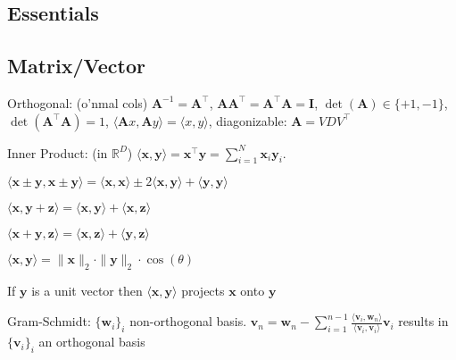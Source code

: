 \documentclass[a4paper, 11pt, landscape]{article}
\begin{document}
\begin{multicols*}{3}

\section{Essentials}
\subsection{Matrix/Vector}
\begin{compactdesc}
	\item[Orthogonal:] (o'nmal cols) $\mathbf{A}^{-1} = \mathbf{A}^\top$, $\mathbf{A} \mathbf{A}^\top = \mathbf{A}^\top \mathbf{A} = \mathbf{I}$, $\operatorname{det}(\mathbf{A}) \in \{+1, -1\}$, $\operatorname{det}(\mathbf{A}^\top \mathbf{A}) = 1$, $\langle \mathbf{A}x, \mathbf{A}y \rangle = \langle x, y \rangle$, diagonizable: $\mathbf{A} = VDV^\top$
	\item[Inner Product:] (in $\mathbb{R}^D$) $\langle \mathbf{x}, \mathbf{y} \rangle = \mathbf{x}^\top \mathbf{y} = \sum_{i=1}^{N} \mathbf{x}_i \mathbf{y}_i$.
	\begin{inparaitem}[\color{red}\textbullet]
		\item $\langle \mathbf{x} \pm \mathbf{y}, \mathbf{x} \pm \mathbf{y} \rangle = \langle \mathbf{x}, \mathbf{x} \rangle \pm 2 \langle \mathbf{x}, \mathbf{y} \rangle + \langle \mathbf{y}, \mathbf{y} \rangle$
		\item $\langle \mathbf{x}, \mathbf{y} + \mathbf{z} \rangle = \langle \mathbf{x}, \mathbf{y} \rangle + \langle \mathbf{x}, \mathbf{z} \rangle$
		\item $\langle \mathbf{x} + \mathbf{y}, \mathbf{z} \rangle = \langle \mathbf{x}, \mathbf{z} \rangle + \langle \mathbf{y}, \mathbf{z} \rangle$
		\item $\langle \mathbf{x}, \mathbf{y} \rangle = \|\mathbf{x}\|_2 \cdot \|\mathbf{y}\|_2 \cdot \cos(\theta)$
		\item If $\mathbf{y}$ is a unit vector then $\langle \mathbf{x}, \mathbf{y} \rangle$ projects $\mathbf{x}$ onto $\mathbf{y}$
	\end{inparaitem}
	\item[Gram-Schmidt:] $\{\mathbf{w}_i\}_i$ non-orthogonal basis. $\mathbf{v}_n = \mathbf{w}_n - \sum_{i=1}^{n-1} \frac{\langle \mathbf{v}_i, \mathbf{w}_n \rangle}{\langle \mathbf{v}_i, \mathbf{v}_i \rangle} \mathbf{v}_i$ results in $\{\mathbf{v}_i\}_i$ an orthogonal basis
\end{compactdesc}


\end{multicols*}
\end{document}
